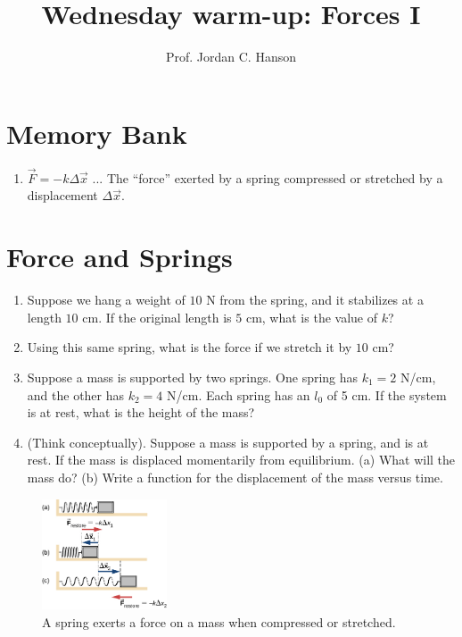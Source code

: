 \documentclass{article}
\begin{document}
\twocolumn

\title{Wednesday warm-up: Forces I}
\author{Prof. Jordan C. Hanson}

\maketitle

\section{Memory Bank}

\begin{enumerate}
\item $\vec{F} = - k \Delta \vec{x}$ ... The ``force'' exerted by a spring compressed or stretched by a displacement $\Delta \vec{x}$.
\end{enumerate}

\section{Force and Springs}

\begin{enumerate}
\item Suppose we hang a weight of $10$ N from the spring, and it stabilizes at a length $10$ cm.  If the original length is $5$ cm, what is the value of $k$? \\ \vspace{3cm}
\item Using this same spring, what is the force if we stretch it by $10$ cm? \\ \vspace{3cm}
\item Suppose a mass is supported by two springs.  One spring has $k_1 = 2$ N/cm, and the other has $k_2 = 4$ N/cm.  Each spring has an $l_0$ of 5 cm.  If the system is at rest, what is the height of the mass? \\ \vspace{3cm}
\item (Think conceptually).  Suppose a mass is supported by a spring, and is at rest.  If the mass is displaced momentarily from equilibrium.  (a) What will the mass do?  (b) Write a function for the displacement of the mass versus time. \\ \vspace{3cm}
\end{enumerate}

\begin{figure}[ht]
\centering
\includegraphics[width=0.33\textwidth]{figures/spring.jpeg}
\caption{\label{fig:1} A spring exerts a force on a mass when compressed or stretched.}
\end{figure}
\end{document}
